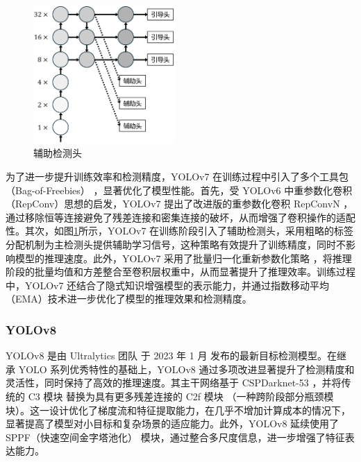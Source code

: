 \documentclass[11pt,twocolumn]{ctexart}
\begin{document}
\begin{figure}[!hbtp]
  \begin{center}
  \includegraphics[width=0.48\textwidth]{辅助检测头}
    \end{center}
  \caption{辅助检测头}
  \label{辅助检测头}
\end{figure}

为了进一步提升训练效率和检测精度，YOLOv7 在训练过程中引入了多个工具包（Bag-of-Freebies） ，显著优化了模型性能。首先，受 YOLOv6 中重参数化卷积（RepConv）思想的启发，YOLOv7 提出了改进版的重参数化卷积 RepConvN ，通过移除恒等连接避免了残差连接和密集连接的破坏，从而增强了卷积操作的适配性。其次，如图\ref{辅助检测头}所示，YOLOv7 在训练阶段引入了辅助检测头，采用粗略的标签分配机制为主检测头提供辅助学习信号，这种策略有效提升了训练精度，同时不影响模型的推理速度。此外，YOLOv7 采用了批量归一化重新参数化策略 ，将推理阶段的批量均值和方差整合至卷积层权重中，从而显著提升了推理效率。训练过程中，YOLOv7 还结合了隐式知识增强模型的表示能力，并通过指数移动平均（EMA）技术进一步优化了模型的推理效果和检测精度。

\subsubsection{YOLOv8}
YOLOv8\cite{yolov8} 是由 Ultralytics 团队 于 2023 年 1 月 发布的最新目标检测模型。在继承 YOLO 系列优秀特性的基础上，YOLOv8 通过多项改进显著提升了检测精度和灵活性，同时保持了高效的推理速度。其主干网络基于 CSPDarknet-53 ，并将传统的 C3 模块 替换为具有更多残差连接的 C2f 模块 （一种跨阶段部分瓶颈模块）。这一设计优化了梯度流和特征提取能力，在几乎不增加计算成本的情况下，显著提高了模型对小目标和复杂场景的适应能力。此外，YOLOv8 延续使用了 SPPF（快速空间金字塔池化） 模块，通过整合多尺度信息，进一步增强了特征表达能力。
\end{document}
